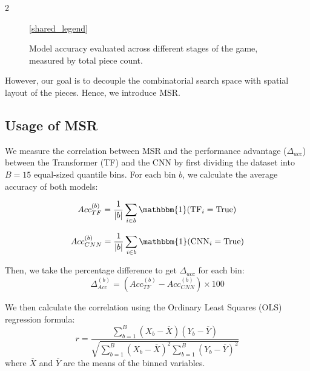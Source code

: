 \documentclass[a4paper,10pt]{article}
\begin{document}
\begin{multicols*}{2}
\begin{figure}[H]
\begin{subfigure}{0.4\textwidth}
    \label{fig:sub_piece}
\end{subfigure}\hfill

\begin{center}
\ref*{shared_legend}
\end{center}

\caption{Model accuracy evaluated across different stages of the game, measured by total piece count.}
\label{fig:combined_acc}
\end{figure}

However, our goal is to decouple the combinatorial search space with spatial layout of the pieces. Hence, we introduce MSR.

\subsection{Usage of MSR}
We measure the correlation between MSR and the performance advantage ($\Delta_{acc}$) between the Transformer (TF) and the CNN by first dividing the dataset into $B = 15$ equal-sized quantile bins. For each bin $b$, we calculate the average accuracy of both models:

\[Acc_{TF}^{(b)} = \frac{1}{|b|} \sum_{i \in b} \mathbbm{1}(\text{TF}_i = \text{True})\]

\[Acc_{CNN}^{(b)} = \frac{1}{|b|} \sum_{i \in b} \mathbbm{1}(\text{CNN}_i = \text{True})\]

Then, we take the percentage difference to get $\Delta_{acc}$ for each bin: 
\[\Delta_{Acc}^{(b)} = \left( Acc_{TF}^{(b)} - Acc_{CNN}^{(b)} \right) \times 100\]

We then calculate the correlation using the Ordinary Least Squares (OLS) regression formula:
\[r = \frac{\sum_{b=1}^{B} (X_b - \overline{X})(Y_b - \overline{Y})}{\sqrt{\sum_{b=1}^{B} (X_b - \overline{X})^2 \sum_{b=1}^{B} (Y_b - \overline{Y})^2}}\]
where $\overline{X}$ and $\overline{Y}$ are the means of the binned variables. 


\end{multicols*}
\end{document}

